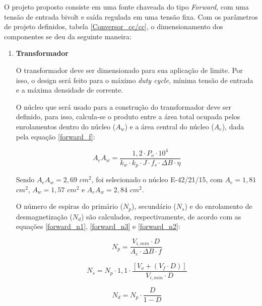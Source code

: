 \begin{apendicesenv}
O projeto proposto consiste em uma fonte chaveada do tipo \textit{Forward}, com uma tensão de entrada bivolt e saída regulada em uma tensão fixa. Com os parâmetros de projeto definidos, tabela \ref{Conversor_cc/cc}, o dimensionamento dos componentes se deu da seguinte maneira:

\begin{enumerate}
    \item \textbf{Transformador}

O transformador deve ser dimensionado para sua aplicação de limite. Por isso, o design será feito para o máximo \textit{duty cycle}, mínima tensão de entrada e a máxima densidade de corrente. 

O núcleo que será usado para a construção do transformador deve ser definido, para isso, calcula-se o produto entre a área total ocupada pelos enrolamentos dentro do núcleo ($A_{w}$) e a área central do núcleo ($A_{e}$), dada pela equação \ref{forward_f}:

    \begin{equation}
        A_{e} A_{w}= \frac{1,2 \cdot P_{o} \cdot 10^{4}}{k_{w} \cdot k_{p} \cdot J \cdot f_{s} \cdot \Delta B \cdot \eta }
        \label{forward_f}
    \end{equation}

Sendo $A_{e} A_{w} = 2,69 $ $cm^{2}$, foi selecionado o núcleo E-42/21/15, com $A_{e} = 1,81$ $cm^{2}$, $A_{w} = 1,57 $ $cm^{2}$ e $A_{e} A_{w} = 2,84 $ $cm^{2}$. 

 O número de espiras do primário ($N_{p}$), secundário ($N_{s}$) e do enrolamento de desmagnetização ($N_{d}$) são calculados, respectivamente, de acordo com as equações \ref{forward_n1},  \ref{forward_n3} e \ref{forward_n2}:

    \begin{equation}
        N_{p} = \frac{V_{i,min} \cdot D}{A_{e} \cdot \Delta B \cdot f}
        \label{forward_n1}
    \end{equation}
    
    \begin{equation}
        N_{s} = N_{p} \cdot 1,1 \cdot \frac{\left[ V_{o} + (V_{f} \cdot D) \right]}{V_{i,min} \cdot D}
        \label{forward_n3}
    \end{equation}

    \begin{equation}
        N_{d} = N_{p} \cdot \frac{D}{1-D}
        \label{forward_n2}
    \end{equation}


\end{enumerate}
\end{apendicesenv}
